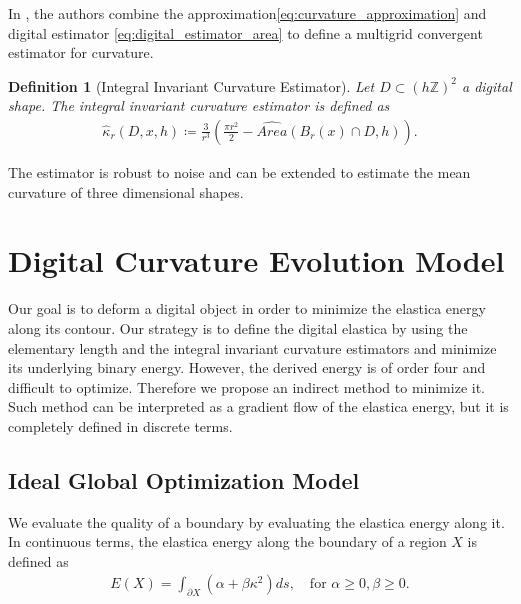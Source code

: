 \documentclass[runningheads]{llncs}
\newtheorem{ddef}{Definition}
\begin{document}
In \cite{coeurjolly13}, the authors combine the approximation\eqref{eq:curvature_approximation} and digital estimator \eqref{eq:digital_estimator_area} to define a multigrid convergent estimator for curvature.

\begin{ddef}[Integral Invariant Curvature Estimator]
  Let $D \subset (h \mathbb{Z})^2$ a digital shape. The integral invariant curvature estimator is defined as
  \begin{align*}
    \hat{\kappa}_{r}(D,x,h) \coloneqq \frac{3}{r^3} \left( \frac{\pi r^2}{2} - \widehat{Area} \left( B_{r} ( x ) \cap D, h \right) \right).
  \end{align*}
\end{ddef}


The estimator is robust to noise and can be extended to estimate the mean curvature of three dimensional shapes.


\section{Digital Curvature Evolution Model}


Our goal is to deform a digital object in order to minimize the elastica energy along its contour. Our strategy is to define the digital elastica by using the elementary length and the integral invariant curvature estimators and minimize its underlying binary energy. However, the derived energy is of order four and difficult to optimize. Therefore we propose an indirect method to minimize it. Such method can be interpreted as a gradient flow of the elastica energy, but it is completely defined in discrete terms.




\subsection{Ideal Global Optimization Model}

We evaluate the quality of a boundary by evaluating the elastica energy along it. In continuous terms, the elastica energy along the boundary of a region $X$ is defined as 
\begin{align*}
  E(X) = \int_{\partial X}{(\alpha + \beta \kappa^2) ds}, \quad \text{for~} \alpha \ge 0, \beta \ge 0.
\end{align*}
\end{document}
